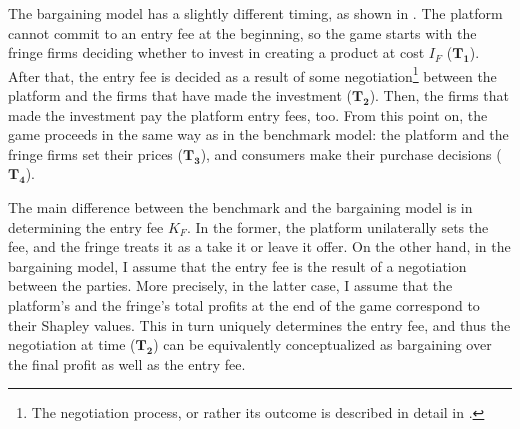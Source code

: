 \documentclass[a4paper]{article}
\begin{document}
The bargaining model has a slightly different timing, as shown in .
The platform cannot commit to an entry fee at the beginning, so the game starts with the fringe firms deciding whether to invest in creating a product at cost $I_F$ ($\mathbf{T_1}$).
After that, the entry fee is decided as a result of some negotiation\footnote{
    The negotiation process, or rather its outcome is described in detail in .
} between the platform and the firms that have made the investment ($\mathbf{T_2}$).
Then, the firms that made the investment pay the platform entry fees, too.
From this point on, the game proceeds in the same way as in the benchmark model: the platform and the fringe firms set their prices ($\mathbf{T_3}$), and consumers make their purchase decisions ($\mathbf{T_4}$). 

The main difference between the benchmark and the bargaining model is in determining the entry fee $K_F$.
In the former, the platform unilaterally sets the fee, and the fringe treats it as a take it or leave it offer.
On the other hand, in the bargaining model, I assume that the entry fee is the result of a negotiation between the parties.
More precisely, in the latter case, I assume that the platform's and the fringe's total profits at the end of the game correspond to their Shapley values.
This in turn uniquely determines the entry fee, and thus the negotiation at time ($\mathbf{T_2}$) can be equivalently conceptualized as bargaining over the final profit as well as the entry fee.
\end{document}
